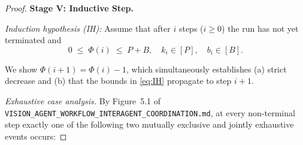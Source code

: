 \documentclass[12pt]{article}
\theoremstyle{definition}
\newcommand{\code}[1]{\texttt{#1}}
\newcommand{\VisionFlow}{\code{VISION\_AGENT\_\allowbreak WORKFLOW\_\allowbreak INTERAGENT\_\allowbreak COORDINATION.md}}
\begin{document}
\begin{proof}
\medskip
\noindent\textbf{Stage V: Inductive Step.}

\noindent\textit{Induction hypothesis (IH):} Assume that after $i$
steps ($i \geq 0$) the run has not yet terminated and
\begin{equation}
\label{eq:IH}
0 \;\leq\; \Phi(i) \;\leq\; P + B, \quad
k_i \in [P], \quad b_i \in [B].
\end{equation}

\noindent We show $\Phi(i+1) = \Phi(i) - 1$, which simultaneously
establishes (a) strict decrease and (b) that the bounds in
\eqref{eq:IH} propagate to step $i+1$.

\medskip
\noindent\textit{Exhaustive case analysis.}
By Figure~5.1 of \VisionFlow{}, at every non-terminal step exactly one of the
following two mutually exclusive and jointly exhaustive events occurs:


\end{proof}
\end{document}
